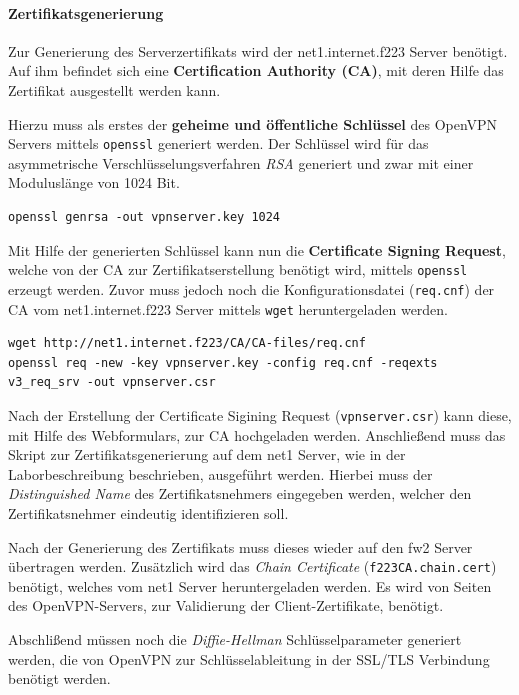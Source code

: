 \paragraph{Zertifikatsgenerierung}

Zur Generierung des Serverzertifikats wird der net1.internet.f223 Server benötigt. Auf ihm befindet sich eine \textbf{Certification Authority (CA)}, mit deren Hilfe das Zertifikat ausgestellt werden kann.

Hierzu muss als erstes der \textbf{geheime und öffentliche Schlüssel} des OpenVPN Servers mittels \texttt{openssl} generiert werden. Der Schlüssel wird für das asymmetrische Verschlüsselungsverfahren \emph{RSA} generiert und zwar mit einer Moduluslänge von 1024 Bit.

\begin{lstlisting}
openssl genrsa -out vpnserver.key 1024
\end{lstlisting}

Mit Hilfe der generierten Schlüssel kann nun die \textbf{Certificate Signing Request}, welche von der CA zur Zertifikatserstellung benötigt wird, mittels \texttt{openssl} erzeugt werden. Zuvor muss jedoch noch die Konfigurationsdatei (\texttt{req.cnf}) der CA vom net1.internet.f223 Server mittels \texttt{wget} heruntergeladen werden.

\begin{lstlisting}
wget http://net1.internet.f223/CA/CA-files/req.cnf
openssl req -new -key vpnserver.key -config req.cnf -reqexts v3_req_srv -out vpnserver.csr
\end{lstlisting}

Nach der Erstellung der Certificate Sigining Request (\texttt{vpnserver.csr}) kann diese, mit Hilfe des Webformulars, zur CA hochgeladen werden.
Anschließend muss das Skript zur Zertifikatsgenerierung auf dem net1 Server, wie in der Laborbeschreibung beschrieben, ausgeführt werden. Hierbei muss der \emph{Distinguished Name} des Zertifikatsnehmers eingegeben werden, welcher den Zertifikatsnehmer eindeutig identifizieren soll.

Nach der Generierung des Zertifikats muss dieses wieder auf den fw2 Server übertragen werden. Zusätzlich wird das \emph{Chain Certificate} (\texttt{f223CA.chain.cert}) benötigt, welches vom net1 Server heruntergeladen werden. Es wird von Seiten des OpenVPN-Servers, zur Validierung der Client-Zertifikate, benötigt.

Abschlißend müssen noch die \emph{Diffie-Hellman} Schlüsselparameter generiert werden, die von OpenVPN zur Schlüsselableitung in der SSL/TLS Verbindung benötigt werden.

